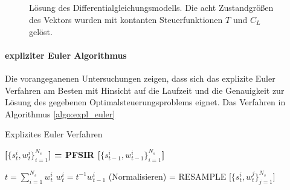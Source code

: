 \begin{figure}[!htbp]
    \centering 
    \qquad
     \\

    \qquad
     \\

    \qquad
     \\

    \qquad
     \\

    \caption{Lösung des Differentialgleichungsmodells. Die acht Zustandgrößen des Vektors wurden mit kontanten Steuerfunktionen \(T\) und \(C_L\) gelöst.}
\end{figure}


\paragraph{expliziter Euler Algorithmus}
Die vorangeganenen Untersuchungen zeigen, dass sich das explizite Euler Verfahren am Besten mit Hinsicht auf die Laufzeit und die Genauigkeit zur Lösung des gegebenen Optimalsteuerungsproblems eignet. Das Verfahren in Algorithmus \ref{algo:expl_euler} 

\begin{algorithm}[H]
    \caption{Explizites Euler Verfahren}\label{algo:expl_euler}
    \textbf{[$\lbrace s^i_t, w^i_t \rbrace^{N_s}_{i=1}$] = PFSIR [$\lbrace s^i_{t-1}, w^i_{t-1} \rbrace^{N_s}_{i=1}$]}
    \begin{algorithmic}
        \STATE $t = \sum_{i=1}^{N_s} w^i_t$
        \STATE $w^i_t = t^{-1} w^i_{t-1}$ (Normalisieren)
        \ENDFOR
        \STATE [$\lbrace s^{\ast j}_t, w^{j}_t, i^{j} \rbrace^{N_s}_{j=1}$] = RESAMPLE [$\lbrace s^i_t, w^{j}_t \rbrace^{N_s}_{j=1}$]
    \end{algorithmic}
\end{algorithm}


